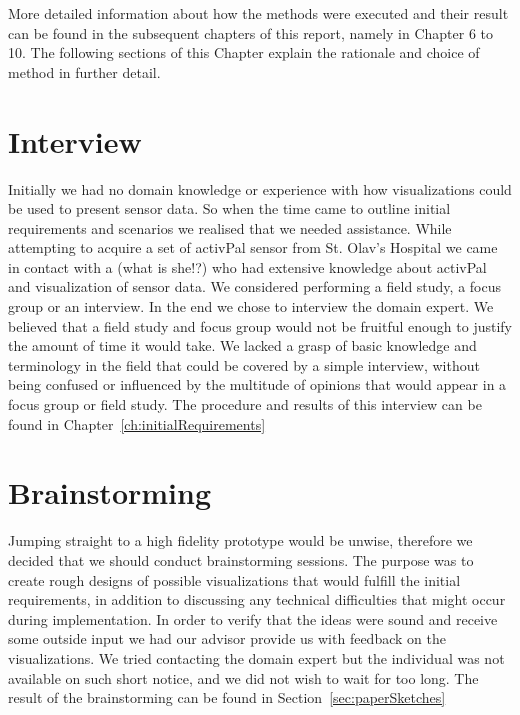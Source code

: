  More detailed information about how the methods were executed and their result can be found in the subsequent chapters of this report, namely in Chapter 6 to 10. The following sections of this Chapter explain the rationale and choice of method in further detail.
 
\section{Interview}
 Initially we had no domain knowledge or experience with how visualizations could be used to present sensor data. So when the time came to outline initial requirements and scenarios we realised that we needed assistance. While attempting to acquire a set of activPal sensor from St. Olav's Hospital we came in contact with a (what is she!?) who had extensive knowledge about activPal and visualization of sensor data. We considered performing a field study, a focus group or an interview. In the end we chose to interview the domain expert. We believed that a field study and focus group would not be fruitful enough to justify the amount of time it would take. We lacked a grasp of basic knowledge and terminology in the field that could be covered by a simple interview, without being confused or influenced by the multitude of opinions that would appear in a focus group or field study. The procedure and results of this interview can be found in Chapter~\ref{ch:initialRequirements} 
 
\section{Brainstorming}
Jumping straight to a high fidelity prototype would be unwise, therefore we decided that we should conduct brainstorming sessions. The purpose was to create rough designs of possible visualizations that would fulfill the initial requirements, in addition to discussing any technical difficulties that might occur during implementation. In order to verify that the ideas were sound and receive some outside input we had our advisor provide us with feedback on the visualizations. We tried contacting the domain expert but the individual was not available on such short notice, and we did not wish to wait for too long. The result of the brainstorming can be found in Section~\ref{sec:paperSketches}


